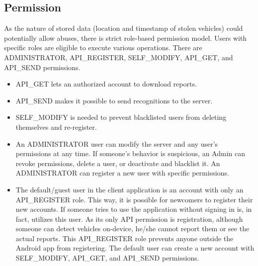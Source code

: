 \subsection{Permission}

As the nature of stored data (location and timestamp of stolen vehicles) could potentially allow abuses, there is strict role-based permission model. Users with specific roles are eligible to execute various operations. There are ADMINISTRATOR, API\_REGISTER, SELF\_MODIFY, API\_GET, and API\_SEND permissions.

\begin{itemize}
  \item API\_GET lets an authorized account to download reports.
  \item API\_SEND makes it possible to send recognitions to the server.
  \item SELF\_MODIFY is needed to prevent blacklisted users from deleting themselves and re-register.
  \item An ADMINISTRATOR user can modify the server and any user’s permissions at any time. If someone’s behavior is suspicious, an Admin can revoke permissions, delete a user, or deactivate and blacklist it. An ADMINISTRATOR can register a new user with specific permissions.
  \item The default/guest user in the client application is an account with only an API\_REGISTER role. This way, it is possible for newcomers to register their new accounts. If someone tries to use the application without signing in is, in fact, utilizes this user. As its only API permission is registration, although someone can detect vehicles on-device, he/she cannot report them or see the actual reports. This API\_REGISTER role prevents anyone outside the Android app from registering. The default user can create a new account with SELF\_MODIFY, API\_GET, and API\_SEND permissions.
\end{itemize}
